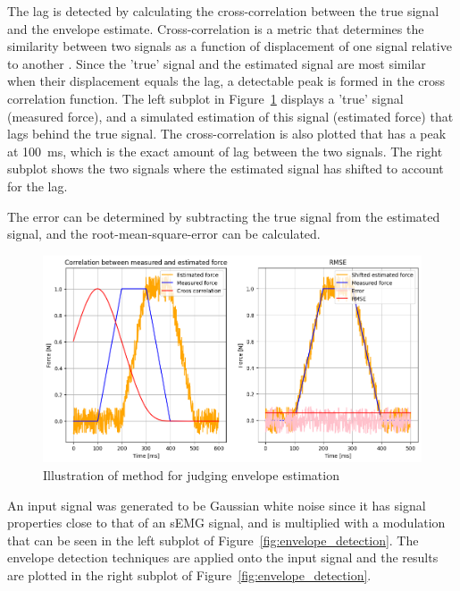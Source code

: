 The lag is detected by calculating the cross-correlation between the true signal and the envelope estimate. Cross-correlation is a metric that determines the similarity between two signals as a function of displacement of one signal relative to another \cite{wiki:cross_correlation}. Since the 'true' signal and the estimated signal are most similar when their displacement equals the lag, a detectable peak is formed in the cross correlation function. The left subplot in Figure~\ref{fig:envelope_estimation_method} displays a 'true' signal (measured force), and a simulated estimation of this signal (estimated force) that lags behind the true signal. The cross-correlation is also plotted that has a peak at \SI{100}{\milli\second}, which is the exact amount of lag between the two signals. The right subplot shows the two signals where the estimated signal has shifted to account for the lag. 

The error can be determined by subtracting the true signal from the estimated signal, and the root-mean-square-error can be calculated. 

\begin{figure}[h!t]
	\begin{center}
		\includegraphics[width=1.0\columnwidth]{images/envelope_estimation_method.png}
	\end{center}
	\caption{Illustration of method for judging envelope estimation}
	\label{fig:envelope_estimation_method}
\end{figure}

An input signal was generated to be Gaussian white noise since it has signal properties close to that of an sEMG signal, and is multiplied with a modulation that can be seen in the left subplot of Figure~\ref{fig:envelope_detection}. The envelope detection techniques are applied onto the input signal and the results are plotted in the right subplot of Figure~\ref{fig:envelope_detection}.

